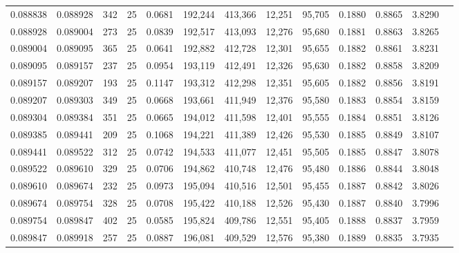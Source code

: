 \begin{tabular}{rrrrrrrrrrrrr}
0.088838 & 0.088928 &   342 &  25 &                                     0.0681 & 192,244 & 413,366 &  12,251 &  95,705 & 0.1880 & 0.8865 & 3.8290 \\
0.088928 & 0.089004 &   273 &  25 &                                     0.0839 & 192,517 & 413,093 &  12,276 &  95,680 & 0.1881 & 0.8863 & 3.8265 \\
0.089004 & 0.089095 &   365 &  25 &                                     0.0641 & 192,882 & 412,728 &  12,301 &  95,655 & 0.1882 & 0.8861 & 3.8231 \\
0.089095 & 0.089157 &   237 &  25 &                                     0.0954 & 193,119 & 412,491 &  12,326 &  95,630 & 0.1882 & 0.8858 & 3.8209 \\
0.089157 & 0.089207 &   193 &  25 &                                     0.1147 & 193,312 & 412,298 &  12,351 &  95,605 & 0.1882 & 0.8856 & 3.8191 \\
0.089207 & 0.089303 &   349 &  25 &                                     0.0668 & 193,661 & 411,949 &  12,376 &  95,580 & 0.1883 & 0.8854 & 3.8159 \\
0.089304 & 0.089384 &   351 &  25 &                                     0.0665 & 194,012 & 411,598 &  12,401 &  95,555 & 0.1884 & 0.8851 & 3.8126 \\
0.089385 & 0.089441 &   209 &  25 &                                     0.1068 & 194,221 & 411,389 &  12,426 &  95,530 & 0.1885 & 0.8849 & 3.8107 \\
0.089441 & 0.089522 &   312 &  25 &                                     0.0742 & 194,533 & 411,077 &  12,451 &  95,505 & 0.1885 & 0.8847 & 3.8078 \\
0.089522 & 0.089610 &   329 &  25 &                                     0.0706 & 194,862 & 410,748 &  12,476 &  95,480 & 0.1886 & 0.8844 & 3.8048 \\
0.089610 & 0.089674 &   232 &  25 &                                     0.0973 & 195,094 & 410,516 &  12,501 &  95,455 & 0.1887 & 0.8842 & 3.8026 \\
0.089674 & 0.089754 &   328 &  25 &                                     0.0708 & 195,422 & 410,188 &  12,526 &  95,430 & 0.1887 & 0.8840 & 3.7996 \\
0.089754 & 0.089847 &   402 &  25 &                                     0.0585 & 195,824 & 409,786 &  12,551 &  95,405 & 0.1888 & 0.8837 & 3.7959 \\
0.089847 & 0.089918 &   257 &  25 &                                     0.0887 & 196,081 & 409,529 &  12,576 &  95,380 & 0.1889 & 0.8835 & 3.7935 \\

\end{tabular}
